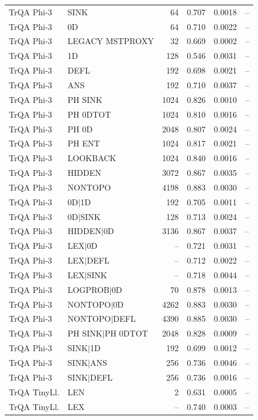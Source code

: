\begin{longtable}{llrrrr}
TrQA Phi-3 & SINK & 64 & 0.707 & 0.0018 & -- \\
TrQA Phi-3 & 0D & 64 & 0.710 & 0.0022 & -- \\
TrQA Phi-3 & LEGACY MSTPROXY & 32 & 0.669 & 0.0002 & -- \\
TrQA Phi-3 & 1D & 128 & 0.546 & 0.0031 & -- \\
TrQA Phi-3 & DEFL & 192 & 0.698 & 0.0021 & -- \\
TrQA Phi-3 & ANS & 192 & 0.710 & 0.0037 & -- \\
TrQA Phi-3 & PH SINK & 1024 & 0.826 & 0.0010 & -- \\
TrQA Phi-3 & PH 0DTOT & 1024 & 0.810 & 0.0016 & -- \\
TrQA Phi-3 & PH 0D & 2048 & 0.807 & 0.0024 & -- \\
TrQA Phi-3 & PH ENT & 1024 & 0.817 & 0.0021 & -- \\
TrQA Phi-3 & LOOKBACK & 1024 & 0.840 & 0.0016 & -- \\
TrQA Phi-3 & HIDDEN & 3072 & 0.867 & 0.0035 & -- \\
TrQA Phi-3 & NONTOPO & 4198 & 0.883 & 0.0030 & -- \\
TrQA Phi-3 & 0D$\mid$1D & 192 & 0.705 & 0.0011 & -- \\
TrQA Phi-3 & 0D$\mid$SINK & 128 & 0.713 & 0.0024 & -- \\
TrQA Phi-3 & HIDDEN$\mid$0D & 3136 & 0.867 & 0.0037 & -- \\
TrQA Phi-3 & LEX$\mid$0D & -- & 0.721 & 0.0031 & -- \\
TrQA Phi-3 & LEX$\mid$DEFL & -- & 0.712 & 0.0022 & -- \\
TrQA Phi-3 & LEX$\mid$SINK & -- & 0.718 & 0.0044 & -- \\
TrQA Phi-3 & LOGPROB$\mid$0D & 70 & 0.878 & 0.0013 & -- \\
TrQA Phi-3 & NONTOPO$\mid$0D & 4262 & 0.883 & 0.0030 & -- \\
TrQA Phi-3 & NONTOPO$\mid$DEFL & 4390 & 0.885 & 0.0030 & -- \\
TrQA Phi-3 & PH SINK$\mid$PH 0DTOT & 2048 & 0.828 & 0.0009 & -- \\
TrQA Phi-3 & SINK$\mid$1D & 192 & 0.699 & 0.0012 & -- \\
TrQA Phi-3 & SINK$\mid$ANS & 256 & 0.736 & 0.0046 & -- \\
TrQA Phi-3 & SINK$\mid$DEFL & 256 & 0.736 & 0.0016 & -- \\
TrQA TinyLl. & LEN & 2 & 0.631 & 0.0005 & -- \\
TrQA TinyLl. & LEX & -- & 0.740 & 0.0003 & -- \\

\end{longtable}
